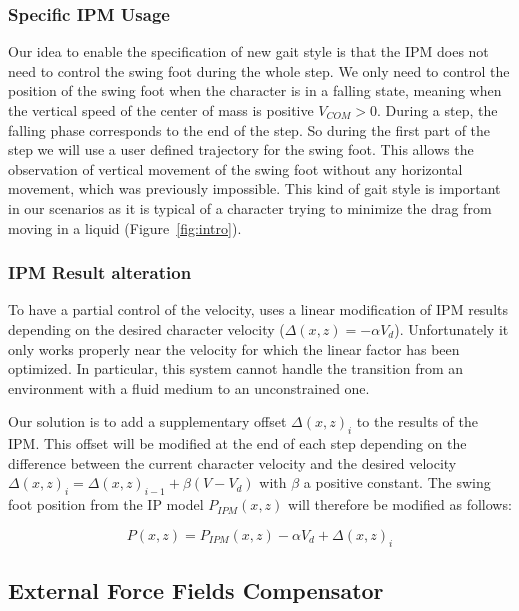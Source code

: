 \documentclass[conference]{acmsiggraph}
\begin{document}
\subsubsection{Specific IPM Usage}
\label{sec:specific_ipm}

Our idea to enable the specification of new gait style is that the IPM does not need to control the swing foot during the whole step. We only need to control the position of the swing foot when the character is in a falling state, meaning when the vertical speed of the center of mass is positive $V_{COM}>0$. During a step, the falling phase corresponds to the end of the step. So during the first part of the step we will use a user defined trajectory for the swing foot. This allows the observation of vertical movement of the swing foot without any horizontal movement, which was previously impossible. This kind of gait style is important in our scenarios as it is typical of a character trying to minimize the drag from moving in a liquid (Figure~\ref{fig:intro}).

\subsubsection{IPM Result alteration}
\label{sec:ipm_alt}

To have a partial control of the velocity, \cite{coros2010generalized} uses a linear modification of IPM results depending on the desired character velocity ($\Delta(x,z)=-\alpha V_d$). Unfortunately it only works properly near the velocity for which the linear factor has been optimized. In particular, this system cannot handle the transition from an environment with a fluid medium to an unconstrained one.

Our solution is to add a supplementary offset $\Delta(x,z)_i$ to the results of the IPM. This offset will be modified at the end of each step depending on the difference between the current character velocity and the desired velocity $\Delta(x,z)_i = \Delta(x,z)_{i-1}+\beta(V-V_d)$ with $\beta$ a positive constant. The swing foot position from the IP model $P_{IPM}(x,z)$ will therefore be modified as follows:

$$
P(x,z) = P_{IPM}(x,z) - \alpha V_d + \Delta(x,z)_i
$$ 

\subsection{External Force Fields Compensator}
\label{sec:ext_force_comp}
\end{document}
